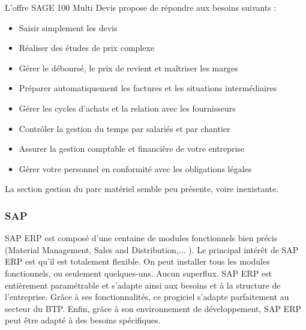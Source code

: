 L'offre SAGE 100 Multi Devis propose de répondre aux besoins suivants :
\begin{itemize}
  \item Saisir simplement les devis
  \item Réaliser des études de prix complexe
  \item Gérer le déboursé, le prix de revient et maîtriser les marges
  \item Préparer automatiquement les factures et les situations intermédiaires
  \item Gérer les cycles d’achats et la relation avec les fournisseurs
  \item Contrôler la gestion du temps par salariés et par chantier
  \item Assurer la gestion comptable et financière de votre entreprise
  \item Gérer votre personnel en conformité avec les obligations légales\\
\end{itemize}

La section gestion du parc matériel semble peu présente, voire inexistante.
				\subsubsection{SAP}

				SAP ERP est composé d'une centaine de modules fonctionnels bien précis (Material Management, Sales and Distribution,... ). 
Le principal intérêt de SAP ERP est qu'il est totalement flexible. On peut installer tous les modules fonctionnels, ou seulement quelques-uns. 
Aucun superflux. SAP ERP est entièrement paramétrable et s'adapte ainsi aux besoins et à la structure de l'entreprise. 
Grâce à ses fonctionnalités, ce progiciel s'adapte parfaitement au secteur du BTP. 
Enfin, grâce à son environnement de développement, SAP ERP peut être adapté à des besoins spécifiques.\\

